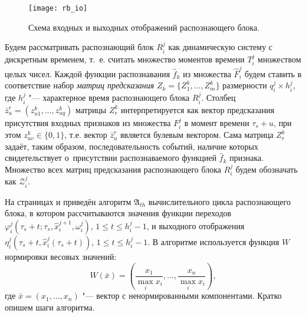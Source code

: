\begin{figure}[h]
	\centering
	\texttt{[image: rb\_io]}
	\caption{Схема входных и выходных отображений распознающего блока.}
	\label{fig:rb_io}
\end{figure}

Будем рассматривать распознающий блок $R_i^j$ как динамическую систему с дискретным временем, т.~е. считать множество моментов времени $T_i^j$ множеством целых чисел. Каждой функции распознавания $\hat{f}_k$ из множества $\hat{F}_i^j$ будем ставить в соответствие набор \textit{матриц предсказания} $Z_k=\{Z_1^k,…,Z_m^k\}$ размерности $q_i^j\times h_i^j$, где $h_i^j$ "--- характерное время распознающего блока $R_i^j$. Столбец $\bar{z}_u^r=(z_{u1}^k,…,z_{uq}^k)$ матрицы $Z_r^k$ интерпретируется как вектор предсказания присутствия входных признаков из множества $F_i^j$ в момент времени $\tau_s+u$, при этом $z_{uv}^k\in\{0,1\}$, т.е. вектор $\bar{z}_u^r$ является булевым вектором. Сама матрица $Z_r^k$ задаёт, таким образом, последовательность событий, наличие которых свидетельствует о~присутствии распознаваемого функцией $\hat{f}_k$ признака. Множество всех матриц предсказания распознающего блока $R_i^j$ будем обозначать как $\mathcal{Z}_i^j$.

На страницах \pageref{alg:th_init} и \pageref{alg:th_cycle} приведён алгоритм $\mathfrak{A}_{th}$ вычислительного цикла распознающего блока, в котором рассчитываются значения функции переходов $\varphi_i^j(\tau_s+t;\tau_s,\hat{x}_i^{j+1},\omega_i^j)$, $1\leqslant{t}\leqslant h_i^j-1$, и выходного отображения $\eta_i^j(\tau_s+t,\hat{x}_i^j(\tau_s+t))$, $1\leqslant{t}\leqslant h_i^j-1$. В алгоритме используется функция $W$ нормировки весовых значений:
\begin{equation}
	W(\bar x)=\left(\frac{x_1}{\max\limits_i x_i},\dots,\frac{x_n}{\max\limits_i x_i}\right),
\end{equation} 
где $\bar x=(x_1,\dots,x_n)$ "--- вектор с ненормированными компонентами. Кратко опишем шаги алгоритма.

